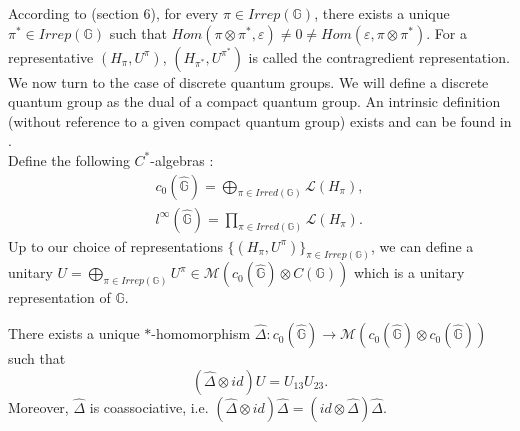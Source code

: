 According to \cite{Wo} (section $6$), for every $\pi\in Irrep(\mathbb G)$, there exists a unique $\pi^*\in Irrep(\mathbb G)$ such that $Hom(\pi\otimes \pi^*,\varepsilon)\neq 0 \neq Hom(\varepsilon,\pi\otimes \pi^*) $. For a representative $(H_\pi,U^\pi)$, $(H_{\pi^*},U^{\pi^*})$ is called the contragredient representation.\\

We now turn to the case of discrete quantum groups. We will define a discrete quantum group as the dual of a compact quantum group. An intrinsic definition (without reference to a given compact quantum group) exists and can be found in \cite{vandaele}.\\

Define the following $C^*$-algebras :
\[\begin{array}{c}
c_0(\hat{\mathbb G})= \bigoplus_{\pi\in Irred(\mathbb G)} \mathcal L(H_\pi),\\
l^\infty(\hat{\mathbb G})= \prod_{\pi\in Irred(\mathbb G)} \mathcal L(H_\pi).
\end{array}\]
Up to our choice of representations $\{(H_\pi,U^\pi)\}_{\pi\in Irrep(\mathbb G)}$, we can define a unitary $U = \bigoplus_{\pi\in Irrep(\mathbb G)} U^\pi\in \mathcal M(c_0(\hat{\mathbb G}) \otimes C(\mathbb G))$ which is a unitary representation of $\mathbb G$. 

\begin{prop} There exists a unique $*$-homomorphism $\hat \Delta : c_0(\hat{\mathbb G}) \rightarrow \mathcal M(c_0(\hat{\mathbb G})\otimes c_0(\hat{\mathbb G}))$ such that \[(\hat\Delta\otimes id ) U = U_{13}U_{23}.\]
Moreover, $\hat\Delta$ is coassociative, i.e. $(\hat\Delta \otimes id) \hat\Delta = (id\otimes \hat\Delta) \hat\Delta$.
\end{prop}

